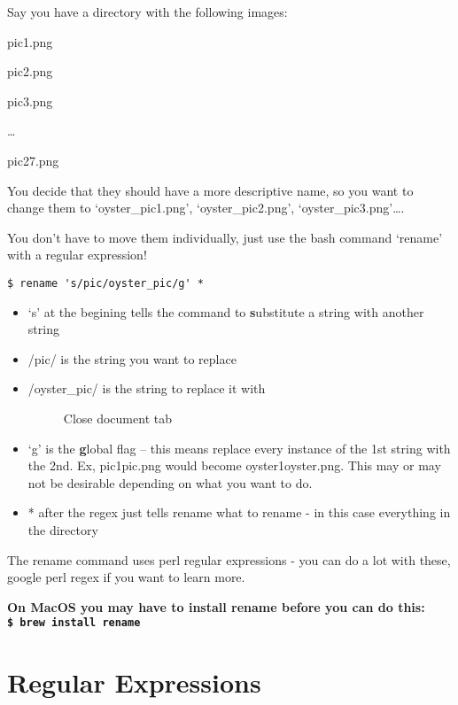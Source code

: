 \documentclass[
  letterpaper,
  DIV=11,
  numbers=noendperiod]{scrreprt}
\begin{document}
Say you have a directory with the following images:

pic1.png

pic2.png

pic3.png

\ldots{}

pic27.png

You decide that they should have a more descriptive name, so you want to
change them to `oyster\_pic1.png', `oyster\_pic2.png',
`oyster\_pic3.png'\ldots.

You don't have to move them individually, just use the bash command
`rename' with a regular expression!

\begin{verbatim}
$ rename 's/pic/oyster_pic/g' *
\end{verbatim}

\begin{itemize}
\item
  `s' at the begining tells the command to \textbf{s}ubstitute a string
  with another string
\item
  /pic/ is the string you want to replace
\item
  /oyster\_pic/ is the string to replace it with

  \begin{figure}

  {\centering 

  }

  \caption{Close document tab}

  \end{figure}
\item
  `g' is the \textbf{g}lobal flag -- this means replace every instance
  of the 1st string with the 2nd. Ex, pic1pic.png would become
  oyster1oyster.png. This may or may not be desirable depending on what
  you want to do.
\item
  * after the regex just tells rename what to rename - in this case
  everything in the directory
\end{itemize}

The rename command uses perl regular expressions - you can do a lot with
these, google perl regex if you want to learn more.

\textbf{On MacOS you may have to install rename before you can do this:
\texttt{\$\ brew\ install\ rename}}

\hypertarget{regular-expressions}{%
\chapter{Regular Expressions}\label{regular-expressions}}
\end{document}
